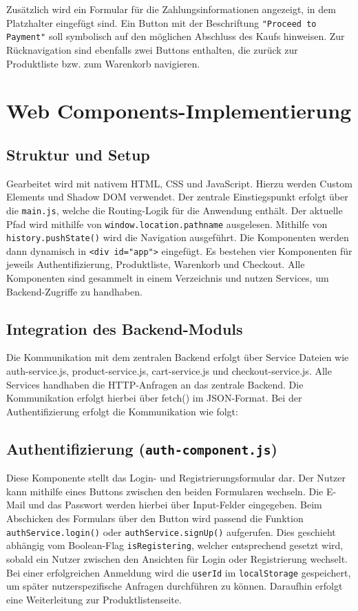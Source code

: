 \documentclass[oneside]{ausarbeitung}
\begin{document}
Zusätzlich wird ein Formular für die Zahlungsinformationen angezeigt, in dem Platzhalter eingefügt sind. Ein Button mit der Beschriftung \texttt{"Proceed to Payment"} soll symbolisch auf den möglichen Abschluss des Kaufs hinweisen.
Zur Rücknavigation sind ebenfalls zwei Buttons enthalten, die zurück zur Produktliste bzw. zum Warenkorb navigieren.

\section{Web Components-Implementierung}

\subsection{Struktur und Setup}

Gearbeitet wird mit nativem HTML, CSS und JavaScript. Hierzu werden Custom Elements und Shadow DOM verwendet. Der zentrale Einstiegspunkt erfolgt über die \texttt{main.js}, welche die Routing-Logik für die Anwendung enthält. Der aktuelle Pfad wird mithilfe von \texttt{window.location.pathname} ausgelesen. Mithilfe von \texttt{history.pushState()} wird die Navigation ausgeführt. Die Komponenten werden dann dynamisch in \texttt{<div id="app">} eingefügt. Es bestehen vier Komponenten für jeweils Authentifizierung, Produktliste, Warenkorb und Checkout. Alle Komponenten sind gesammelt in einem Verzeichnis und nutzen Services, um Backend-Zugriffe zu handhaben.

\subsection{Integration des Backend-Moduls}

Die Kommunikation mit dem zentralen Backend erfolgt über Service Dateien wie auth-service.js, product-service.js, cart-service.js und checkout-service.js. 
Alle Services handhaben die HTTP-Anfragen an das zentrale Backend. Die Kommunikation erfolgt hierbei über fetch() im JSON-Format. 
Bei der Authentifizierung erfolgt die Kommunikation wie folgt: 



\subsection{Authentifizierung (\texttt{auth-component.js})}

Diese Komponente stellt das Login- und Registrierungsformular dar. Der Nutzer kann mithilfe eines Buttons zwischen den beiden Formularen wechseln. Die E-Mail und das Passwort werden hierbei über Input-Felder eingegeben. Beim Abschicken des Formulars über den Button wird passend die Funktion \texttt{authService.login()} oder \texttt{authService.signUp()} aufgerufen. Dies geschieht abhängig vom Boolean-Flag \texttt{isRegistering}, welcher entsprechend gesetzt wird, sobald ein Nutzer zwischen den Ansichten für Login oder Registrierung wechselt. Bei einer erfolgreichen Anmeldung wird die \texttt{userId} im \texttt{localStorage} gespeichert, um später nutzerspezifische Anfragen durchführen zu können. Daraufhin erfolgt eine Weiterleitung zur Produktlistenseite.
\end{document}
